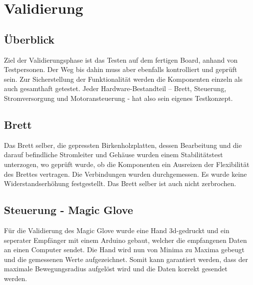 \chapter{Validierung} \label{Validierung}

\section{Überblick} \label{ValidUeberblick}
Ziel der Validierungsphase ist das Testen auf dem fertigen Board, anhand von Testpersonen. Der Weg bis dahin muss aber ebenfalls kontrolliert und geprüft sein. Zur Sicherstellung der Funktionalität werden die Komponenten einzeln als auch gesamthaft getestet. 
Jeder Hardware-Bestandteil – Brett, Steuerung, Stromversorgung und Motoransteuerung - hat also sein eigenes Testkonzept.

\section{Brett} \label{ValidBrett}
Das Brett selber, die gepressten Birkenholzplatten, dessen Bearbeitung und die darauf befindliche Stromleiter und Gehäuse wurden einem Stabilitätstest unterzogen, wo geprüft wurde, ob die Komponenten ein Ausreizen der Flexibilität des Brettes vertragen. Die Verbindungen wurden durchgemessen. Es wurde keine Widerstandserhöhung festgestellt. Das Brett selber ist auch nicht zerbrochen.

\section{Steuerung - Magic Glove} \label{ValidSteuerMagicGlove}
Für die Validierung des Magic Glove wurde eine Hand 3d-gedruckt und ein seperater Empfänger mit einem Arduino gebaut, welcher die empfangenen Daten an einen Computer sendet. Die Hand wird nun von Minima zu Maxima gebeugt und die gemessenen Werte aufgezeichnet. Somit kann garantiert werden, dass der maximale Bewegungsradius aufgelöst wird und die Daten korrekt gesendet werden.
